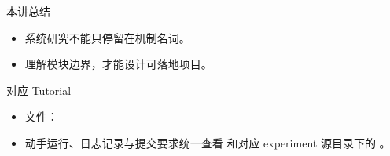 \begin{frame}{本讲总结}
  \begin{itemize}
    \item 系统研究不能只停留在机制名词。
    \item 理解模块边界，才能设计可落地项目。
  \end{itemize}
\end{frame}

\LectureSevenSources

\begin{frame}{对应 Tutorial}
  \begin{itemize}
    \item 文件：\texttt{}
    \item 动手运行、日志记录与提交要求统一查看 \texttt{} 和对应 experiment 源目录下的 \texttt{}。
  \end{itemize}
\end{frame}


